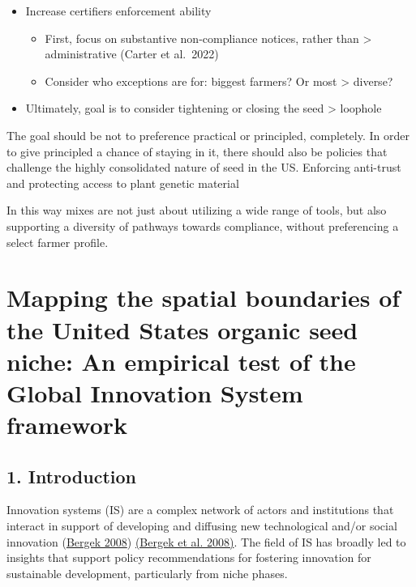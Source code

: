 \documentclass[twoside,12pt,final]{ucthesis-CA2012}
\begin{document}
\begin{ucmainmatter}
\begin{itemize}
\begin{itemize}
  \end{itemize}
\item
  Increase certifiers enforcement ability
  \begin{itemize}
  \item
    First, focus on substantive non-compliance notices, rather than
    \textgreater{} administrative (Carter et al.~2022)
  \item
    Consider who exceptions are for: biggest farmers? Or most
    \textgreater{} diverse?
  \end{itemize}
\item
  Ultimately, goal is to consider tightening or closing the seed
  \textgreater{} loophole
\end{itemize}
The goal should be not to preference practical or principled,
completely. In order to give principled a chance of staying in it, there
should also be policies that challenge the highly consolidated nature of
seed in the US. Enforcing anti-trust and protecting access to plant
genetic material

In this way mixes are not just about utilizing a wide range of tools,
but also supporting a diversity of pathways towards compliance, without
preferencing a select farmer profile.

\hypertarget{mapping-the-spatial-boundaries-of-the-united-states-organic-seed-niche-an-empirical-test-of-the-global-innovation-system-framework}{%
\chapter{Mapping the spatial boundaries of the United State\textquotesingle s organic seed niche: An empirical test of the Global Innovation System framework}\label{mapping-the-spatial-boundaries-of-the-united-states-organic-seed-niche-an-empirical-test-of-the-global-innovation-system-framework}}


\hypertarget{introduction-2}{%
\section{1. Introduction}\label{introduction-2}}

Innovation systems (IS) are a complex network of actors and institutions
that interact in support of developing and diffusing new technological
and/or social innovation (\protect\hyperlink{ref-bergek2008}{Bergek 2008}) \href{https://www.zotero.org/google-docs/?CqKd0Z}{(Bergek et al.
2008)}. The field of IS has
broadly led to insights that support policy recommendations for
fostering innovation for sustainable development, particularly from
\textquotesingle niche\textquotesingle{} phases.


\end{ucmainmatter}
\end{document}
